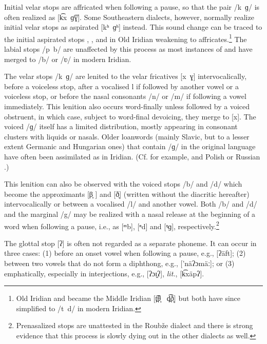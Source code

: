 Initial velar stops are affricated when following a pause, so that the pair
/k~ɡ/ is often realized as [k͡x~ɡ͡ɣ]. Some Southeastern dialects, however,
normally realize initial velar stops as aspirated [kʰ~ɡʰ] instead. This sound
change can be traced to the initial aspirated stops ,
,  and  in Old Iridian weakening to
affricates.\footnote{Old Iridian  and  became the
Middle Iridian [t̪͡θ̞ ~d̪͡ð̞] but both have since simplified to /t~d/ in modern
Iridian.} The labial stops /{p~b}/ are unaffected by this process as most
instances of  and  have merged to /b/ or /ʋ/ in modern
Iridian.

The velar stops /k~ɡ/ are lenited to the velar fricatives [x~ɣ]
intervocalically, before a voiceless stop, after a vocalised l if followed by
another vowel or a voiceless stop, or before the nasal consonants /n/ or /m/ if
following a vowel immediately. This lenition also occurs word-finally unless
followed by a voiced obstruent, in which case, subject to word-final devoicing,
they merge to [x]. The voiced /ɡ/ itself has a limited distribution, mostly
appearing in consonant clusters with liquids or nasals. Older loanwords (mainly
Slavic, but to a lesser extent Germanic and Hungarian ones) that contain /ɡ/ in
the original language have often been assimilated as  in Iridian. (Cf.
for example,  and Polish  or Russian
.)

This lenition can also be observed with the voiced stops /b/ and /d/ which
become the approximants [β̞	] and [ð̞] (written without the diacritic hereafter)
intervocalically or between a vocalised /l/ and another vowel. Both /b/ and /d/
and the marginal /g/ may be realized with a nasal release at the beginning of a
word when following a pause, i.e., as [ᵐb], [ⁿd] and [ᵑɡ],
respectively.\footnote{Prenasalized stops are unattested in the Roubže dialect
and there is strong evidence that this process is slowly dying out in the other
dialects as well.} 

The glottal stop [ʔ] is often not regarded as a separate phoneme. It can occur
in three cases: (1) before an onset vowel when following a pause, e.g.,
 [ʔäft]; (2) between two vowels that do not form a diphthong,
e.g.,  ['näʔɔmäː]; or (3) emphatically, especially in
interjections, e.g.,  [ʔɔɪ̯ʔ], 
\emph{lit.},  [k͡xäpʔ].

